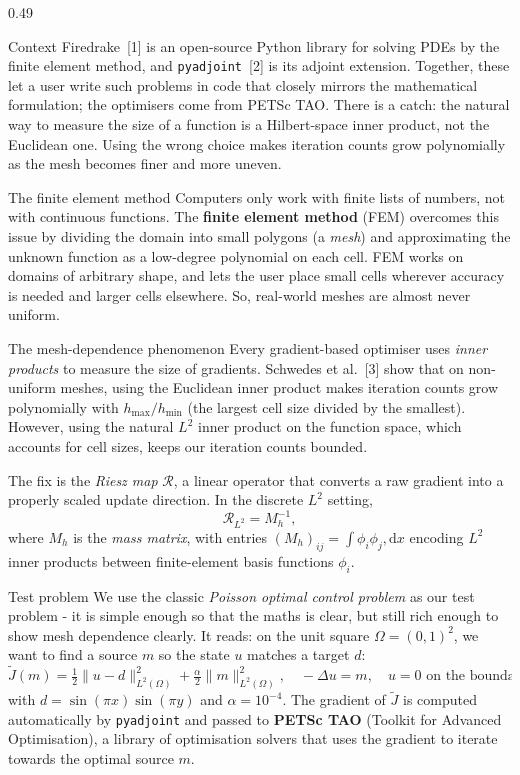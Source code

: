 \documentclass[final]{beamer}
\newcommand{\Om}{\Omega}
\newcommand{\Lp}[1]{L^{2}(#1)}
\newcommand{\Rmap}{\mathcal{R}}
\newcommand{\Jt}{\tilde{J}}
\begin{document}
\begin{frame}[t]
\begin{columns}[t,totalwidth=\dimexpr\paperwidth-3cm\relax]
\begin{column}{0.49\dimexpr\paperwidth-3cm\relax}
\begin{block}{Context}
Firedrake~[1] is an open-source Python library for solving PDEs by the finite element method, and \texttt{pyadjoint}~[2] is its adjoint extension. Together, these let a user write such problems in code that closely mirrors the mathematical formulation; the optimisers come from PETSc TAO. There is a catch: the natural way to measure the size of a function is a Hilbert-space inner product, not the Euclidean one. Using the wrong choice makes iteration counts grow polynomially as the mesh becomes finer and more uneven.
\end{block}

\begin{block}{The finite element method}
Computers only work with finite lists of numbers, not with continuous functions. The \textbf{finite element method} (FEM) overcomes this issue by dividing the domain into small polygons (a \emph{mesh}) and approximating the unknown function as a low-degree polynomial on each cell. FEM works on domains of arbitrary shape, and lets the user place small cells wherever accuracy is needed and larger cells elsewhere. So, real-world meshes are almost never uniform.
\end{block}


\begin{block}{The mesh-dependence phenomenon}
Every gradient-based optimiser uses \emph{inner products} to measure the size of gradients. Schwedes et al.~[3] show that on non-uniform meshes, using the Euclidean inner product makes iteration counts grow polynomially with $h_{\max}/h_{\min}$ (the largest cell size divided by the smallest). However, using the natural $L^{2}$ inner product on the function space, which accounts for cell sizes, keeps our iteration counts bounded.

The fix is the \emph{Riesz map} $\Rmap$, a linear operator that converts a raw gradient into a properly scaled update direction. In the discrete $L^{2}$ setting,
\[
\Rmap_{L^{2}} = M_h^{-1},
\]
where $M_h$ is the \emph{mass matrix}, with entries $(M_h)_{ij} = \displaystyle\int \phi_i\phi_j,\mathrm{d}x$ encoding $L^{2}$ inner products between finite-element basis functions $\phi_i$.
\end{block}

\begin{block}{Test problem}
We use the classic \emph{Poisson optimal control problem} as our test problem - it is simple enough so that the maths is clear, but still rich enough to show mesh dependence clearly. It reads: on the unit square $\Om = (0,1)^{2}$, we want to find a source $m$ so the state $u$ matches a target $d$:
\[
\Jt(m) = \tfrac{1}{2}\|u-d\|_{\Lp{\Om}}^{2} + \tfrac{\alpha}{2}\|m\|_{\Lp{\Om}}^{2},
\quad
-\Delta u = m,\quad u = 0 \text{ on the boundary } \partial\Om,
\]
with $d = \sin(\pi x)\sin(\pi y)$ and $\alpha = 10^{-4}$. The gradient of $\Jt$ is computed automatically by \texttt{pyadjoint} and passed to \textbf{PETSc TAO} (Toolkit for Advanced Optimisation), a library of optimisation solvers that uses the gradient to iterate towards the optimal source $m$.
\end{block}


\end{column}
\end{columns}
\end{frame}
\end{document}
